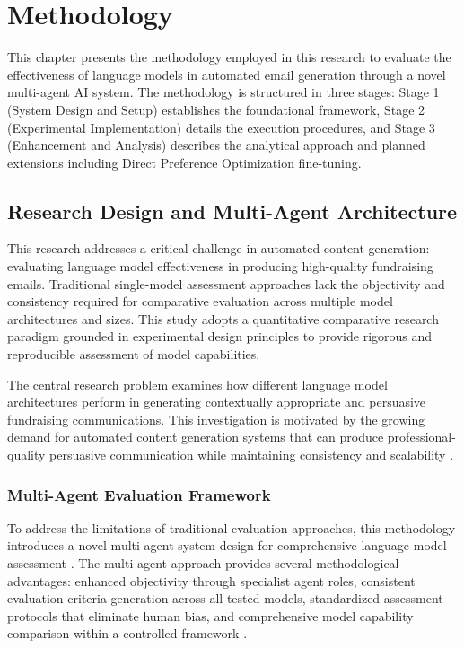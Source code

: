 \chapter{Methodology}

This chapter presents the methodology employed in this research to evaluate the effectiveness of language models in automated email generation through a novel multi-agent AI system. The methodology is structured in three stages: Stage 1 (System Design and Setup) establishes the foundational framework, Stage 2 (Experimental Implementation) details the execution procedures, and Stage 3 (Enhancement and Analysis) describes the analytical approach and planned extensions including Direct Preference Optimization fine-tuning.

\section{Research Design and Multi-Agent Architecture}
\label{sec:research-design-architecture}

This research addresses a critical challenge in automated content generation: evaluating language model effectiveness in producing high-quality fundraising emails. Traditional single-model assessment approaches lack the objectivity and consistency required for comparative evaluation across multiple model architectures and sizes. This study adopts a quantitative comparative research paradigm grounded in experimental design principles to provide rigorous and reproducible assessment of model capabilities.

The central research problem examines how different language model architectures perform in generating contextually appropriate and persuasive fundraising communications. This investigation is motivated by the growing demand for automated content generation systems that can produce professional-quality persuasive communication while maintaining consistency and scalability \cite{murakami2023nlg_advertising, zheng2023click_controllable}.

\subsection{Multi-Agent Evaluation Framework}

To address the limitations of traditional evaluation approaches, this methodology introduces a novel multi-agent system design for comprehensive language model assessment \cite{guo2024llm_multiagent, yan2025beyond_selftalk}. The multi-agent approach provides several methodological advantages: enhanced objectivity through specialist agent roles, consistent evaluation criteria generation across all tested models, standardized assessment protocols that eliminate human bias, and comprehensive model capability comparison within a controlled framework \cite{yehudai2025survey_llm_agents, ma2024agentboard}.

